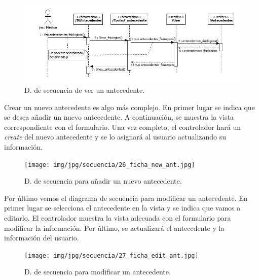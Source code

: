 \documentclass[a4paper,oneside,11pt]{book}
\begin{document}
				\begin{figure}[H]
				  \centering
				    \includegraphics[width=16cm]{img/jpg/secuencia/25_ficha_showanteced.jpg}
				  \caption{D. de secuencia de ver un antecedente.}
				  \label{fig:cont_ficha_ant}
				\end{figure}
			
			Crear un nuevo antecedente es algo más complejo. En primer lugar se indica que se desea añadir un nuevo antecedente. A continuación, se muestra la vista correspondiente con el formulario. Una vez completo, el controlador hará un \textit{create} del nuevo antecedente y se lo asignará al usuario actualizando su información.
			
				\begin{figure}[H]
				  \centering
				    \texttt{[image: img/jpg/secuencia/26\_ficha\_new\_ant.jpg]}
				  \caption{D. de secuencia para añadir un nuevo antecedente.}
				  \label{fig:cont_ficha_ant_new}
				\end{figure}
			
			Por último vemos el diagrama de secuencia para modificar un antecedente. En primer lugar se selecciona el antecedente en la vista y se indica que vamos a editarlo. El controlador muestra la vista adecuada con el formulario para modificar la información. Por último, se actualizará el antecedente y la información del usuario.
			
				\begin{figure}[H]
				  \centering
				    \texttt{[image: img/jpg/secuencia/27\_ficha\_edit\_ant.jpg]}
				  \caption{D. de secuencia para modificar un antecedente.}
				  \label{fig:cont_ficha_ant_edit}
				\end{figure}
			


	
	
\end{document}
